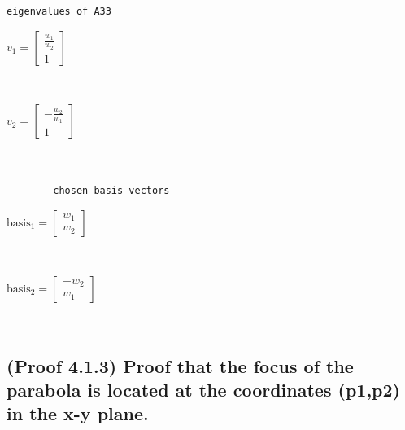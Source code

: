 \documentclass[11pt]{article}
\begin{document}
            \begin{Verbatim}[commandchars=\\\{\}]
        eigenvalues of A33
            \end{Verbatim}

            $\displaystyle v_{1} = \left[\begin{matrix}\frac{w_{1}}{w_{2}}\\1\end{matrix}\right]$

            
            \begin{Verbatim}[commandchars=\\\{\}]


            \end{Verbatim}

            $\displaystyle v_{2} = \left[\begin{matrix}- \frac{w_{2}}{w_{1}}\\1\end{matrix}\right]$

            
            \begin{Verbatim}[commandchars=\\\{\}]


        chosen basis vectors
            \end{Verbatim}

            $\displaystyle \mathrm{basis_1} = \left[\begin{matrix}w_{1}\\w_{2}\end{matrix}\right]$

            
            \begin{Verbatim}[commandchars=\\\{\}]


            \end{Verbatim}

            $\displaystyle \mathrm{basis_2} = \left[\begin{matrix}- w_{2}\\w_{1}\end{matrix}\right]$

            
            \begin{Verbatim}[commandchars=\\\{\}]


            \end{Verbatim}

    \subsection{(Proof 4.1.3) Proof that the focus of the parabola is located at the coordinates (p1,p2) in the x-y plane.}\label{proof-that-the-focus-of-the-parabola-is-located-at-the-coordinates-p1p2-in-the-x-y-plane.}
\end{document}
